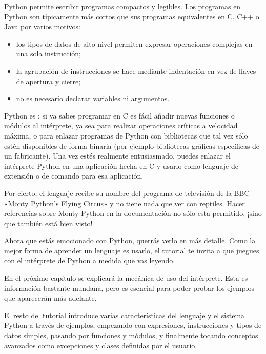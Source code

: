 \documentclass[a5paper,10pt,spanish]{sphinxmanual}
\begin{document}
\sphinxAtStartPar
Python permite escribir programas compactos y legibles. Los programas en Python son típicamente más cortos que sus programas equivalentes en C, C++ o Java por varios motivos:
\begin{itemize}
\item {} 
\sphinxAtStartPar
los tipos de datos de alto nivel permiten expresar operaciones complejas en una sola instrucción;

\item {} 
\sphinxAtStartPar
la agrupación de instrucciones se hace mediante indentación en vez de llaves de apertura y cierre;

\item {} 
\sphinxAtStartPar
no es necesario declarar variables ni argumentos.

\end{itemize}

\sphinxAtStartPar
Python es : si ya sabes programar en C es fácil añadir nuevas funciones o módulos al intérprete, ya sea para realizar operaciones críticas a velocidad máxima, o para enlazar programas de Python con bibliotecas que tal vez sólo estén disponibles de forma binaria (por ejemplo bibliotecas gráficas específicas de un fabricante). Una vez estés realmente entusiasmado, puedes enlazar el intérprete Python en una aplicación hecha en C y usarlo como lenguaje de extensión o de comando para esa aplicación.

\sphinxAtStartPar
Por cierto, el lenguaje recibe su nombre del programa de televisión de la BBC «Monty Python’s Flying Circus» y no tiene nada que ver con reptiles. Hacer referencias sobre Monty Python en la documentación no sólo esta permitido, ¡sino que también está bien visto!

\sphinxAtStartPar
Ahora que estás emocionado con Python, querrás verlo en más detalle. Como la mejor forma de aprender un lenguaje es usarlo, el tutorial te invita a que juegues con el intérprete de Python a medida que vas leyendo.

\sphinxAtStartPar
En el próximo capítulo se explicará la mecánica de uso del intérprete. Esta es información bastante mundana, pero es esencial para poder probar los ejemplos que aparecerán más adelante.

\sphinxAtStartPar
El resto del tutorial introduce varias características del lenguaje y el sistema Python a través de ejemplos, empezando con expresiones, instrucciones y tipos de datos simples, pasando por funciones y módulos, y finalmente tocando conceptos avanzados como excepciones y clases definidas por el usuario.
\end{document}
